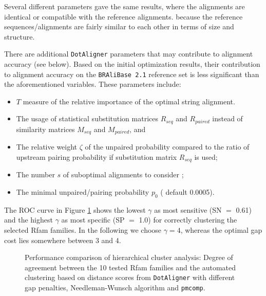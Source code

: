 \documentclass[a4paper,twoside]{article}
\newcommand\dotaligner{\texttt{DotAligner}}
\newcommand\bralibase{\texttt{BRAliBase 2.1}}
\newcommand\pmcomp{\texttt{pmcomp}}
\newcommand{\GRAY}[1]{\textcolor{mygray}{#1}}
\begin{document}
Several different parameters gave the same results, where the alignments are identical or compatible with the reference alignments.
 because the reference sequences/alignments are fairly similar to each other in terms of size and structure. 



There are additional \dotaligner{} parameters that may contribute to alignment 
accuracy (see below). Based on the initial optimization results, their contribution
to alignment accuracy on the \bralibase{} reference set is less significant than the
aforementioned variables. These parameters include: 
\begin{itemize}
	\item $T$ measure of the relative importance of the optimal string alignment.
	\item The usage of statistical substitution matrices $R_{seq}$ and $R_{paired}$ instead of  similarity matrices $M_{seq}$ and $M_{paired}$, and
	\item The relative weight $\zeta$ of the unpaired probability compared to the 
	ratio of upstream pairing probability if substitution matrix $R_{seq}$ is used;
	\item The number $s$ of suboptimal alignments to consider ;
	\item The minimal unpaired/pairing probability $p_0$ ( default 0.0005).
\end{itemize}


\GRAY{The ROC curve in Figure \ref{fig:roc} shows the lowest $\gamma$ as most
sensitive (SN $=$ 0.61) and the highest $\gamma$ as most specific (SP
$=$ 1.0) for correctly clustering the selected Rfam families. In the
following we choose $\gamma=4$, whereas the optimal gap cost lies
somewhere between 3 and 4.}

\begin{figure}[!h]
  \centering
  {}
  \caption{\GRAY{Performance comparison of hierarchical cluster analysis: Degree of
  agreement between the 10 tested Rfam families and the automated clustering
  based on distance scores from \dotaligner{} with different gap penalties,
  Needleman-Wunsch algorithm and \pmcomp{}.}}
  \label{fig:roc}
\end{figure}

\end{document}
